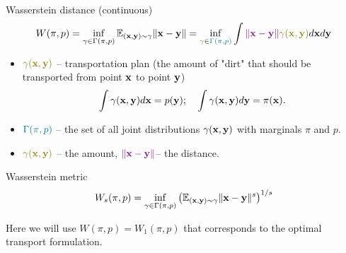 \begin{frame}{Wasserstein distance (continuous)}
	\vspace{-0.7cm}
	\[
	W(\pi, p) = \inf_{\gamma \in \Gamma(\pi, p)} \bbE_{(\bx, \by) \sim \gamma} \| \bx - \by \| =  \inf_{{\color{olive}\gamma}\in {\color{teal}\Gamma(\pi, p)}} \int {\color{violet} \| \bx - \by \|} {\color{olive}\gamma (\bx, \by)} d \bx d \by
	\]
	\vspace{-0.4cm}
	\begin{itemize}
		\item ${\color{olive}\gamma (\bx, \by)}$ -- transportation plan (the amount of "dirt" that should be transported from point $\mathbf{x}$ to point $\mathbf{y}$)
		\vspace{-0.2cm}
		\[
		\int \gamma(\mathbf{x}, \mathbf{y}) d \mathbf{x} = p(\mathbf{y}); \quad \int \gamma(\mathbf{x}, \mathbf{y}) d \mathbf{y} = \pi(\mathbf{x}).
		\]
		\vspace{-0.6cm}
		\item ${\color{teal}\Gamma(\pi, p)}$ -- the set of all joint distributions $\gamma (\mathbf{x}, \mathbf{y})$ with marginals $\pi$ and $p$.
		\item ${\color{olive}\gamma(\bx, \by)}$ -- the amount, ${\color{violet} \| \mathbf{x} - \mathbf{y} \|}$-- the distance.
	\end{itemize}
	\begin{block}{Wasserstein metric}
		\vspace{-0.2cm}
		\[
		W_s(\pi, p) = \inf_{\gamma \in \Gamma(\pi, p)} \left(\mathbb{E}_{(\mathbf{x}, \mathbf{y}) \sim \gamma} \| \mathbf{x} - \mathbf{y} \|^s\right)^{1/s}
		\]
		\vspace{-0.4cm}
	\end{block}
	Here we will use $W(\pi, p) = W_1(\pi, p)$ that corresponds to the optimal transport formulation.
\end{frame}
